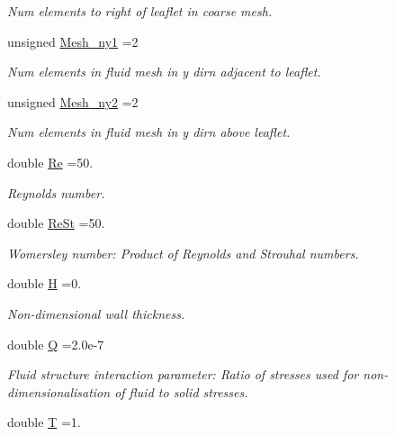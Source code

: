 \begin{DoxyCompactItemize}
\begin{DoxyCompactList}\small\item\em Num elements to right of leaflet in coarse mesh. \end{DoxyCompactList}\item 
unsigned \hyperlink{namespaceGlobal__Parameters_a77f2f492d44897203cceb4cbadef7aba}{Mesh\+\_\+ny1} =2
\begin{DoxyCompactList}\small\item\em Num elements in fluid mesh in y dirn adjacent to leaflet. \end{DoxyCompactList}\item 
unsigned \hyperlink{namespaceGlobal__Parameters_ab0c1b5c0070b43a56ef64b106b6e2930}{Mesh\+\_\+ny2} =2
\begin{DoxyCompactList}\small\item\em Num elements in fluid mesh in y dirn above leaflet. \end{DoxyCompactList}\item 
double \hyperlink{namespaceGlobal__Parameters_a9d72e94a9305c6a310940a6a427ebe06}{Re} =50.
\begin{DoxyCompactList}\small\item\em Reynolds number. \end{DoxyCompactList}\item 
double \hyperlink{namespaceGlobal__Parameters_a7a59a32365e87566069e458dc83bd18a}{Re\+St} =50.
\begin{DoxyCompactList}\small\item\em Womersley number\+: Product of Reynolds and Strouhal numbers. \end{DoxyCompactList}\item 
double \hyperlink{namespaceGlobal__Parameters_ab360628e7830e43e355ce5768f6d6a6c}{H} =0.
\begin{DoxyCompactList}\small\item\em Non-\/dimensional wall thickness. \end{DoxyCompactList}\item 
double \hyperlink{namespaceGlobal__Parameters_a7814fddf663e56168174a42d2cd6b4c1}{Q} =2.\+0e-\/7
\begin{DoxyCompactList}\small\item\em Fluid structure interaction parameter\+: Ratio of stresses used for non-\/dimensionalisation of fluid to solid stresses. \end{DoxyCompactList}\item 
double \hyperlink{namespaceGlobal__Parameters_aeb964d25d190afd43c8317d4217f31b4}{T} =1.

\end{DoxyCompactItemize}

